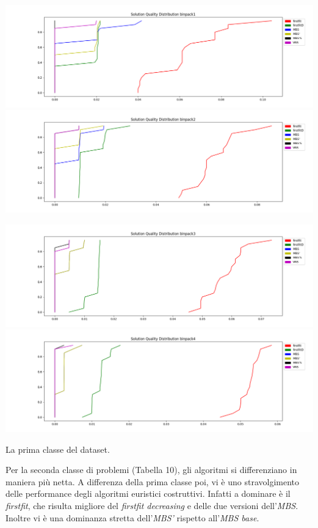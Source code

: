 \documentclass{article}
\begin{document}
\begin{table}[H]
\label{tab1}
\includegraphics[scale=0.23]{pic/binpack1}
\includegraphics[scale=0.23]{pic/binpack2}

\includegraphics[scale=0.23]{pic/binpack3}
\includegraphics[scale=0.23]{pic/binpack4}
\caption{La prima classe del dataset.}
\end{table}

Per la seconda classe di problemi (Tabella 10), gli algoritmi si differenziano in maniera più netta. A differenza della prima classe poi, vi è uno stravolgimento delle performance degli algoritmi euristici costruttivi. Infatti a dominare è il \textit{firstfit}, che risulta migliore del \textit{firstfit decreasing} e delle due versioni dell'\textit{MBS}. Inoltre vi è una dominanza stretta dell'\textit{MBS'} rispetto all'\textit{MBS base}.
\end{document}

